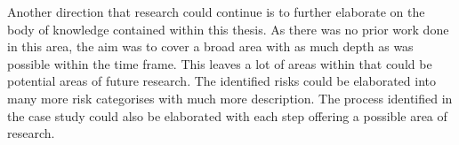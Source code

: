 Another direction that research could continue is to further elaborate on the body of knowledge contained within this thesis. As there was no prior work done in this area, the aim was to cover a broad area with as much depth as was possible within the time frame. This leaves a lot of areas within that could  be potential areas of future research. The identified risks could be elaborated into many more risk categorises with much more description. The process identified in the case study could also be elaborated with each step offering a possible area of research.